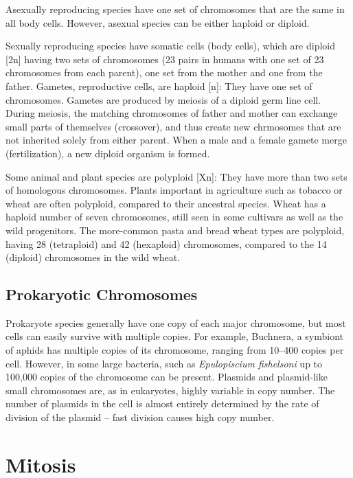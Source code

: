 Asexually reproducing species have one set of chromosomes that are the same in all body cells. However, asexual species can be either haploid or diploid.

Sexually reproducing species have somatic cells (body cells), which are diploid {[}2n{]} having two sets of chromosomes (23 pairs in humans with one set of 23 chromosomes from each parent), one set from the mother and one from the father. Gametes, reproductive cells, are haploid {[}n{]}: They have one set of chromosomes. Gametes are produced by meiosis of a diploid germ line cell. During meiosis, the matching chromosomes of father and mother can exchange small parts of themselves (crossover), and thus create new chrmosomes that are not inherited solely from either parent. When a male and a female gamete merge (fertilization), a new diploid organism is formed.

Some animal and plant species are polyploid {[}Xn{]}: They have more than two sets of homologous chromosomes. Plants important in agriculture such as tobacco or wheat are often polyploid, compared to their ancestral species. Wheat has a haploid number of seven chromosomes, still seen in some cultivars as well as the wild progenitors. The more-common pasta and bread wheat types are polyploid, having 28 (tetraploid) and 42 (hexaploid) chromosomes, compared to the 14 (diploid) chromosomes in the wild wheat.

\hypertarget{prokaryotic-chromosomes}{%
\subsection{Prokaryotic Chromosomes}\label{prokaryotic-chromosomes}}

Prokaryote species generally have one copy of each major chromosome, but most cells can easily survive with multiple copies. For example, Buchnera, a symbiont of aphids has multiple copies of its chromosome, ranging from 10--400 copies per cell. However, in some large bacteria, such as \emph{Epulopiscium fishelsoni} up to 100,000 copies of the chromosome can be present. Plasmids and plasmid-like small chromosomes are, as in eukaryotes, highly variable in copy number. The number of plasmids in the cell is almost entirely determined by the rate of division of the plasmid -- fast division causes high copy number.

\hypertarget{mitosis}{%
\section{Mitosis}\label{mitosis}}


